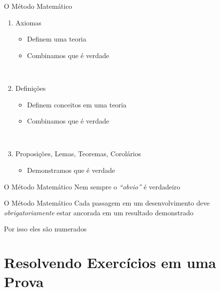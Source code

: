 \documentclass[fleqn,aspectratio=169,12pt]{beamer}
\begin{document}
\begin{frame}{O Método Matemático}
  \begin{enumerate}[<+->]
    \item Axiomas
    \begin{itemize}
      \item Definem uma teoria
      \item Combinamos que é verdade
    \end{itemize}
    ~

    \item Definições
    \begin{itemize}
      \item Definem conceitos em uma teoria
      \item Combinamos que é verdade
    \end{itemize}
    ~

    \item Proposições, Lemas, Teoremas, Corolários
    \begin{itemize}
      \item Demonstramos que é verdade
    \end{itemize}
  \end{enumerate}
\end{frame}

\begin{frame}{O Método Matemático}
  Nem sempre o \textit{``obvio''} é verdadeiro
\end{frame}

\begin{frame}{O Método Matemático}
  Cada passagem em um desenvolvimento deve \\
  \emph{obrigatoriamente}
  estar ancorada em um resultado demonstrado

  \pause
  \bigskip
  Por isso eles são numerados
\end{frame}

\section{Resolvendo Exercícios em uma Prova}
\end{document}
